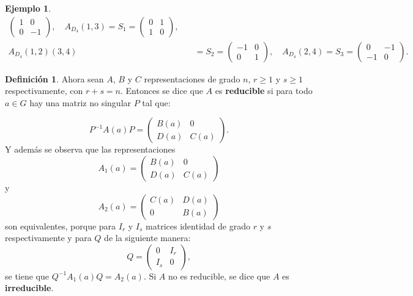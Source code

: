 \documentclass[12pt]{book}
\theoremstyle{definition}
\newtheorem{definition}[theorem]{Definición}
\newtheorem{example}[theorem]{Ejemplo}
\newcounter{in}
\newcounter{ini}
\begin{document}
\begin{example}
\begin{equation*}
\begin{aligned}
\begin{pmatrix}
    1 & 0 \\
    0 & -1
    \end{pmatrix}, \quad
A_{D_{4}}(1, 3) = S_{1} =\begin{pmatrix}
    0 & 1 \\
    1 & 0
    \end{pmatrix}, \quad \\
A_{D_{4}}(1, 2)(3, 4) & = S_{2} =\begin{pmatrix}
    -1 & 0 \\
    0 & 1
    \end{pmatrix}, \quad
A_{D_{4}}(2, 4) = S_{3} = \begin{pmatrix}
    0 & -1 \\
    -1 & 0
    \end{pmatrix}.
\end{aligned}
\end{equation*} 


\end{example}
\begin{definition} 
Ahora sean $A$, $B$ y $C$ representaciones de grado $n$,
$r \geq 1$ y $s \geq 1$ respectivamente, con $r+s=n$. Entonces se dice
que $A$ es \textbf{reducible} si para todo $a \in G$ hay una matriz no
singular $P$ tal que:

\begin{equation*}
  P^{-1}A\left(a\right)P=
  \begin{pmatrix}
    B\left(a\right) & 0 \\
    D\left(a\right) & C\left(a\right)
  \end{pmatrix}. 
\end{equation*}  
Y además se observa que las representaciones
\begin{equation*}
  A_{1}\left(a\right)=
  \begin{pmatrix}
    B\left(a\right) & 0 \\
    D\left(a\right) & C\left(a\right)
  \end{pmatrix}
\end{equation*}
y
\begin{equation*} 
   A_{2}\left(a\right)=
  \begin{pmatrix}
    C\left(a\right) & D\left(a\right) \\
    0 & B\left(a\right)
  \end{pmatrix}
\end{equation*}
son equivalentes, porque para $I_{r}$ y $I_{s}$ matrices identidad de
grado $r$ y $s$ respectivamente y para $Q$ de la siguiente manera:
\begin{equation*}
  Q=
  \begin{pmatrix}
    0 & I_{r} \\ 
    I_{s} & 0
  \end{pmatrix},
\end{equation*}
se tiene que $Q^{-1}A_{1}\left(a\right)Q=A_{2}\left(a\right)$. Si $A$ no es reducible, se dice que $A$ es \textbf{irreducible}.
\end{definition}
\end{document}
